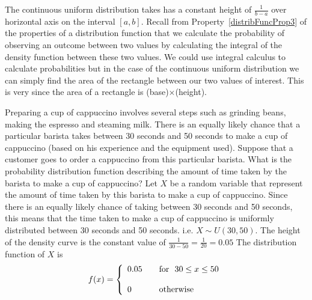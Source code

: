 The continuous uniform distribution takes has a constant height of $\frac{1}{b-a}$ over horizontal axis on the interval $[a,b]$.
Recall from Property~\ref{distribFuncProp3} of the properties of a distribution function that we calculate the probability of observing an outcome between two values by calculating the integral of the density function 
between these two values.
We could use integral calculus to calculate probabilities but in the case of the continuous uniform distribution we can simply find the area of the rectangle between our two values of interest.
This is very since the area of a rectangle is (base)$\times$(height).

\begin{example}{Preparing a cup of cappuccino involves several steps such as grinding beans, making the espresso and steaming milk.
There is an equally likely chance that a particular barista takes between 30 seconds and 50 seconds
to make a cup of cappuccino (based on his experience and the equipment used).
Suppose that a customer goes to order a cappuccino from this particular barista.
What is the probability distribution function describing the amount of time taken by the barista to make a cup of cappuccino?}\label{UniformBaristaExample}
Let $X$ be a random variable that represent the amount of time taken by this barista to make a cup of cappuccino.
Since there is an equally likely chance of taking between 30 seconds and 50 seconds, this means
that the time taken to make a cup of cappuccino is uniformly distributed between 30 seconds and 50 seconds.
i.e. $X \sim U(30, 50)$.
The height of the density curve is the constant value of $\frac{1}{30 - 50} = \frac{1}{20} = 0.05$
The distribution function of $X$ is
\[ f(x) = \left\{ 
  \begin{array}{l l}
	0.05			& \quad \text{for }  ~ 30 \leq x \leq 50\\
	\hfill\\
	0 			& \quad \text{otherwise}
  \end{array} \right.\]

\end{example}


